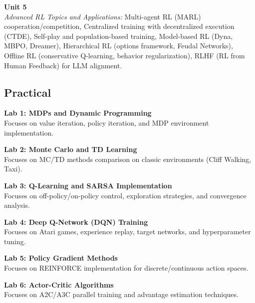 \vspace{0.3cm}

\noindent\textbf{Unit 5} \\
\textit{Advanced RL Topics and Applications:} Multi-agent RL (MARL) cooperation/competition, Centralized training with decentralized execution (CTDE), Self-play and population-based training, Model-based RL (Dyna, MBPO, Dreamer), Hierarchical RL (options framework, Feudal Networks), Offline RL (conservative Q-learning, behavior regularization), RLHF (RL from Human Feedback) for LLM alignment.

\newpage

\subsection*{Practical}
\noindent\textbf{Lab 1: MDPs and Dynamic Programming} \\
Focuses on value iteration, policy iteration, and MDP environment implementation.

\vspace{0.2cm}

\noindent\textbf{Lab 2: Monte Carlo and TD Learning} \\
Focuses on MC/TD methods comparison on classic environments (Cliff Walking, Taxi).

\vspace{0.2cm}

\noindent\textbf{Lab 3: Q-Learning and SARSA Implementation} \\
Focuses on off-policy/on-policy control, exploration strategies, and convergence analysis.

\vspace{0.2cm}

\noindent\textbf{Lab 4: Deep Q-Network (DQN) Training} \\
Focuses on Atari games, experience replay, target networks, and hyperparameter tuning.

\vspace{0.2cm}

\noindent\textbf{Lab 5: Policy Gradient Methods} \\
Focuses on REINFORCE implementation for discrete/continuous action spaces.

\vspace{0.2cm}

\noindent\textbf{Lab 6: Actor-Critic Algorithms} \\
Focuses on A2C/A3C parallel training and advantage estimation techniques.

